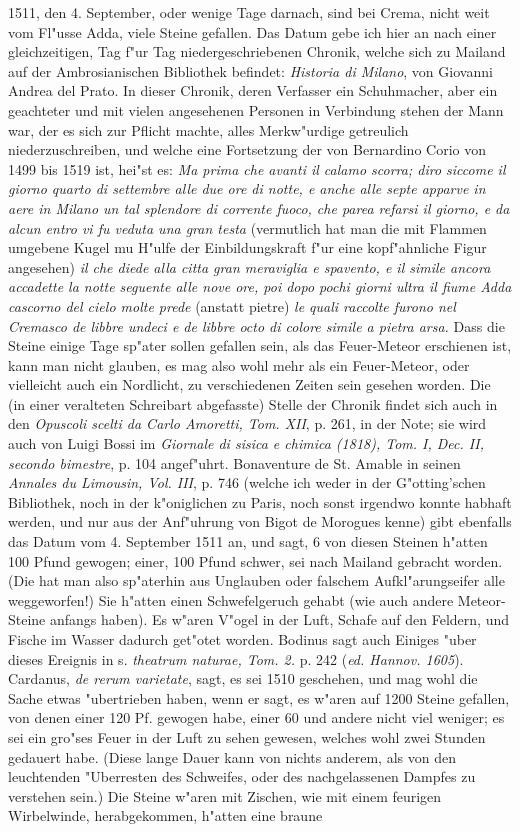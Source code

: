 \documentclass[a4paper, 11pt, oneside, polutonikogreek, german]{article}
\begin{document}
1511, den 4. September, oder wenige Tage darnach, sind bei Crema, nicht weit vom Fl"usse Adda, viele Steine gefallen. Das Datum gebe ich hier an nach einer gleichzeitigen, Tag f"ur Tag niedergeschriebenen Chronik, welche sich zu Mailand auf der Ambrosianischen Bibliothek befindet: \emph{Historia di Milano}, von Giovanni Andrea del Prato. In dieser Chronik, deren Verfasser ein Schuhmacher, aber ein geachteter und mit vielen angesehenen Personen in Verbindung stehen der Mann war, der es sich zur Pflicht machte, alles Merkw"urdige getreulich niederzuschreiben, und welche eine Fortsetzung der von Bernardino Corio von 1499 bis 1519 ist, hei"st es: \emph{Ma prima che avanti il calamo scorra; diro siccome il giorno quarto di settembre alle due ore di notte, e anche alle septe apparve in aere in Milano un tal splendore di corrente fuoco, che parea refarsi il giorno, e da alcun entro vi fu veduta una gran testa} (vermutlich hat man die mit Flammen umgebene Kugel mu H"ulfe der Einbildungskraft f"ur eine kopf"ahnliche Figur angesehen) \emph{il che diede alla citta gran meraviglia e spavento, e il simile ancora accadette la notte seguente alle nove ore, poi dopo pochi giorni ultra il fiume Adda cascorno del cielo molte prede} (anstatt pietre) \emph{le quali raccolte furono nel Cremasco de libbre undeci e de libbre octo di colore simile a pietra arsa.} Dass die Steine einige Tage sp"ater sollen gefallen sein, als das Feuer-Meteor erschienen ist, kann man nicht glauben, es mag also wohl mehr als ein Feuer-Meteor, oder vielleicht auch ein Nordlicht, zu verschiedenen Zeiten sein gesehen worden. Die (in einer veralteten Schreibart abgefasste) Stelle der Chronik findet sich auch in den \emph{Opuscoli scelti da Carlo Amoretti, Tom. XII}, p. 261, in der Note; sie wird auch von Luigi Bossi im \emph{Giornale di sisica e chimica (1818), Tom. I, Dec. II, secondo bimestre}, p. 104 angef"uhrt. Bonaventure de St. Amable in seinen \emph{Annales du Limousin, Vol. III}, p. 746 (welche ich weder in der G"otting'schen Bibliothek, noch in der k"oniglichen zu Paris, noch sonst irgendwo konnte habhaft werden, und nur aus der Anf"uhrung von Bigot de Morogues kenne) gibt ebenfalls das Datum vom 4. September 1511 an, und sagt, 6 von diesen Steinen h"atten 100 Pfund gewogen; einer, 100 Pfund schwer, sei nach Mailand gebracht worden. (Die hat man also sp"aterhin aus Unglauben oder falschem Aufkl"arungseifer alle weggeworfen!) Sie h"atten einen Schwefelgeruch gehabt (wie auch andere Meteor-Steine anfangs haben). Es w"aren V"ogel in der Luft, Schafe auf den Feldern, und Fische im Wasser dadurch get"otet worden. Bodinus sagt auch Einiges "uber dieses Ereignis in s. \emph{theatrum naturae, Tom. 2.} p. 242 (\emph{ed. Hannov. 1605}). Cardanus, \emph{de rerum varietate}, sagt, es sei 1510 geschehen, und mag wohl die Sache etwas "ubertrieben haben, wenn er sagt, es w"aren auf 1200 Steine gefallen, von denen einer 120 Pf. gewogen habe, einer 60 und andere nicht viel weniger; es sei ein gro"ses Feuer in der Luft zu sehen gewesen, welches wohl zwei Stunden gedauert habe. (Diese lange Dauer kann von nichts anderem, als von den leuchtenden "Uberresten des Schweifes, oder des nachgelassenen Dampfes zu verstehen sein.) Die Steine w"aren mit Zischen, wie mit einem feurigen Wirbelwinde, herabgekommen, h"atten eine braune 
\end{document}
